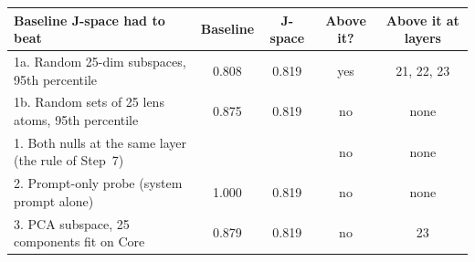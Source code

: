 \begin{tabularx}{\linewidth}{@{}Xcccc@{}}\toprule
Baseline J-space had to beat & Baseline & J-space & Above it? & Above it at layers\\\midrule
1a. Random 25-dim subspaces, 95th percentile & 0.808 & 0.819 & yes & 21, 22, 23\\
1b. Random sets of 25 lens atoms, 95th percentile & 0.875 & 0.819 & no & none\\
1. Both nulls at the same layer (the rule of Step~7) &  &  & no & none\\
2. Prompt-only probe (system prompt alone) & 1.000 & 0.819 & no & none\\
3. PCA subspace, 25 components fit on Core & 0.879 & 0.819 & no & 23\\
\bottomrule\end{tabularx}
